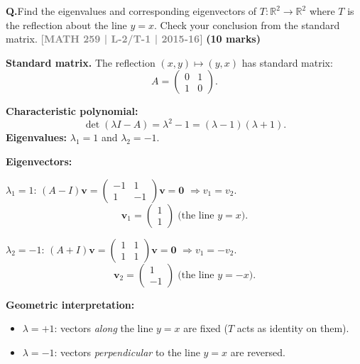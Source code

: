 \documentclass[12pt,a3paper]{article}
\newcommand{\yr}[1]{\hfill\textcolor{gray}{\small\textbf{[#1]}}}
\newcommand{\mk}[1]{\textcolor{orange!70!black}{\small\textbf{(#1 marks)}}}
\newcounter{qnum}
\newcommand{\Q}[1]{%
  \needspace{4\baselineskip}
  \refstepcounter{qnum}
  \vspace{6pt}
  \noindent\textbf{Q\theqnum.}\enspace #1\par
}
\begin{document}
\Q{Find the eigenvalues and corresponding eigenvectors of $T: \mathbb{R}^2 \to \mathbb{R}^2$ where $T$ is the reflection about the line $y = x$. Check your conclusion from the standard matrix.
\yr{MATH 259 | L-2/T-1 | 2015-16} \mk{10}}


\begin{tcolorbox}[enhanced,breakable,
  colback=cF!4,colframe=cF,boxrule=0.8pt,arc=5pt,
  title={\textbf{Answer --- Reflection about $y=x$: Eigenvalues \& Eigenvectors}},
  fonttitle=\bfseries\color{white},colbacktitle=cF]

\textbf{Standard matrix.} The reflection $(x,y)\mapsto(y,x)$ has standard matrix:
\[
A=\begin{pmatrix}0&1\\1&0\end{pmatrix}.
\]

\textbf{Characteristic polynomial:}
\[
\det(\lambda I-A)=\lambda^2-1=(\lambda-1)(\lambda+1).
\]
\textbf{Eigenvalues:} $\lambda_1=1$ and $\lambda_2=-1$.

\textbf{Eigenvectors:}

$\lambda_1=1$: $(A-I)\mathbf{v}=\begin{pmatrix}-1&1\\1&-1\end{pmatrix}\mathbf{v}=\mathbf{0}$
$\Rightarrow v_1=v_2$.
\[
\mathbf{v}_1=\begin{pmatrix}1\\1\end{pmatrix}\;\text{(the line }y=x\text{)}.
\]

$\lambda_2=-1$: $(A+I)\mathbf{v}=\begin{pmatrix}1&1\\1&1\end{pmatrix}\mathbf{v}=\mathbf{0}$
$\Rightarrow v_1=-v_2$.
\[
\mathbf{v}_2=\begin{pmatrix}1\\-1\end{pmatrix}\;\text{(the line }y=-x\text{)}.
\]

\textbf{Geometric interpretation:}
\begin{itemize}[itemsep=2pt]
  \item $\lambda=+1$: vectors \emph{along} the line $y=x$ are fixed ($T$ acts as identity on them).
  \item $\lambda=-1$: vectors \emph{perpendicular} to the line $y=x$ are reversed.
\end{itemize}


\end{tcolorbox}
\end{document}
